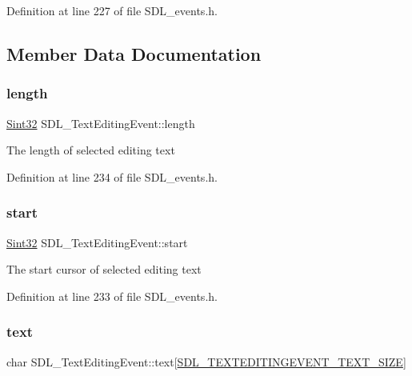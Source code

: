 Definition at line 227 of file S\+D\+L\+\_\+events.\+h.



\subsection{Member Data Documentation}
\mbox{\label{struct_s_d_l___text_editing_event_adca95505c0bf212834930df58f6d1aa5}} 
\subsubsection{\texorpdfstring{length}{length}}
{\footnotesize\ttfamily \mbox{\hyperlink{_s_d_l__stdinc_8h_a7a90b941db9d4582e9ad7abb9940ff7e}{Sint32}} S\+D\+L\+\_\+\+Text\+Editing\+Event\+::length}

The length of selected editing text 

Definition at line 234 of file S\+D\+L\+\_\+events.\+h.

\mbox{\label{struct_s_d_l___text_editing_event_ac6c6a00835d92b12c0ba5b78b5ad676d}} 
\subsubsection{\texorpdfstring{start}{start}}
{\footnotesize\ttfamily \mbox{\hyperlink{_s_d_l__stdinc_8h_a7a90b941db9d4582e9ad7abb9940ff7e}{Sint32}} S\+D\+L\+\_\+\+Text\+Editing\+Event\+::start}

The start cursor of selected editing text 

Definition at line 233 of file S\+D\+L\+\_\+events.\+h.

\mbox{\label{struct_s_d_l___text_editing_event_a29848c2e7819ea98ae8fb08543e6d420}} 
\subsubsection{\texorpdfstring{text}{text}}
{\footnotesize\ttfamily char S\+D\+L\+\_\+\+Text\+Editing\+Event\+::text\mbox{[}\mbox{\hyperlink{_s_d_l__events_8h_a2399de7b94f0570b853f5da9c5db7e82}{S\+D\+L\+\_\+\+T\+E\+X\+T\+E\+D\+I\+T\+I\+N\+G\+E\+V\+E\+N\+T\+\_\+\+T\+E\+X\+T\+\_\+\+S\+I\+ZE}}\mbox{]}}


